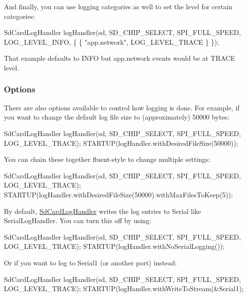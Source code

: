 And finally, you can use logging categories as well to set the level for certain categories\+:


\begin{DoxyCode}
SdCardLogHandler logHandler(sd, SD\_CHIP\_SELECT, SPI\_FULL\_SPEED, LOG\_LEVEL\_INFO, \{
    \{ "app.network", LOG\_LEVEL\_TRACE \} 
\});
\end{DoxyCode}


That example defaults to I\+N\+FO but app.\+network events would be at T\+R\+A\+CE level.

\subsubsection*{Options}

There are also options available to control how logging is done. For example, if you want to change the default log file size to (approximately) 50000 bytes\+:


\begin{DoxyCode}
SdCardLogHandler logHandler(sd, SD\_CHIP\_SELECT, SPI\_FULL\_SPEED, LOG\_LEVEL\_TRACE);
STARTUP(logHandler.withDesiredFileSize(50000));
\end{DoxyCode}


You can chain these together fluent-\/style to change multiple settings\+:


\begin{DoxyCode}
SdCardLogHandler logHandler(sd, SD\_CHIP\_SELECT, SPI\_FULL\_SPEED, LOG\_LEVEL\_TRACE);
STARTUP(logHandler.withDesiredFileSize(50000).withMaxFilesToKeep(5));
\end{DoxyCode}


By default, \mbox{\hyperlink{class_sd_card_log_handler}{Sd\+Card\+Log\+Handler}} writes the log entries to Serial like Serial\+Log\+Handler. You can turn this off by using\+:


\begin{DoxyCode}
SdCardLogHandler logHandler(sd, SD\_CHIP\_SELECT, SPI\_FULL\_SPEED, LOG\_LEVEL\_TRACE);
STARTUP(logHandler.withNoSerialLogging());
\end{DoxyCode}


Or if you want to log to Serial1 (or another port) instead\+:


\begin{DoxyCode}
SdCardLogHandler logHandler(sd, SD\_CHIP\_SELECT, SPI\_FULL\_SPEED, LOG\_LEVEL\_TRACE);
STARTUP(logHandler.withWriteToStream(&Serial1);
\end{DoxyCode}


